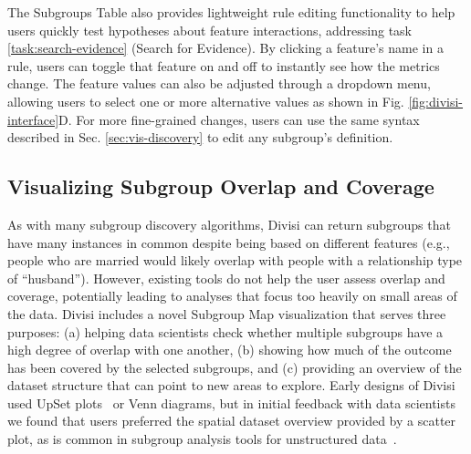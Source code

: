 The Subgroups Table also provides lightweight rule editing functionality to help users quickly test hypotheses about feature interactions, addressing task \ref{task:search-evidence} (Search for Evidence).
By clicking a feature's name in a rule, users can toggle that feature on and off to instantly see how the metrics change.
The feature values can also be adjusted through a dropdown menu, allowing users to select one or more alternative values as shown in Fig. \ref{fig:divisi-interface}D.
For more fine-grained changes, users can use the same syntax described in Sec. \ref{sec:vis-discovery} to edit any subgroup's definition.

\subsection{Visualizing Subgroup Overlap and Coverage}
\label{sec:vis-curation}

As with many subgroup discovery algorithms, Divisi can return subgroups that have many instances in common despite being based on different features (e.g., people who are married would likely overlap with people with a relationship type of ``husband'').
However, existing tools do not help the user assess overlap and coverage, potentially leading to analyses that focus too heavily on small areas of the data.
Divisi includes a novel Subgroup Map visualization that serves three purposes: (a) helping data scientists check whether multiple subgroups have a high degree of overlap with one another, (b) showing how much of the outcome has been covered by the selected subgroups, and (c) providing an overview of the dataset structure that can point to new areas to explore.
Early designs of Divisi used UpSet plots~\cite{2014_infovis_upset} or Venn diagrams, but in initial feedback with data scientists we found that users preferred the spatial dataset overview provided by a scatter plot, as is common in subgroup analysis tools for unstructured data~\cite{suresh_kaleidoscope_2023,robertson_angler_2023,Liu2019}.

